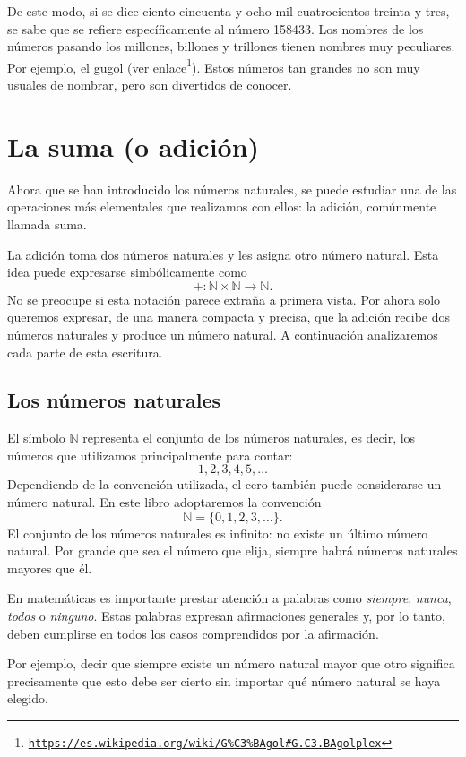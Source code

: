 De este modo, si se dice ciento cincuenta y ocho mil cuatrocientos treinta y tres, se sabe que se refiere específicamente al número 158433. Los nombres de los números pasando los millones, billones y trillones tienen nombres muy peculiares. Por ejemplo, el \href{https://es.wikipedia.org/wiki/G\%C3\%BAgol\#G.C3.BAgolplex}{gugol} (ver enlace\footnote{\href{https://es.wikipedia.org/wiki/G\%C3\%BAgol\#G.C3.BAgolplex}{\texttt{https://es.wikipedia.org/wiki/G\%C3\%BAgol\#G.C3.BAgolplex}}}). Estos números tan grandes no son muy usuales de nombrar, pero son divertidos de conocer.

\section{La suma (o adición)}

Ahora que se han introducido los números naturales, se puede estudiar una de las operaciones más elementales que realizamos con ellos: la adición, comúnmente llamada suma.

La adición toma dos números naturales y les asigna otro número natural. Esta idea puede expresarse simbólicamente como
\[
+\colon\mathbb{N}\times\mathbb{N}\to\mathbb{N}.
\]
No se preocupe si esta notación parece extraña a primera vista. Por ahora solo queremos expresar, de una manera compacta y precisa, que la adición recibe dos números naturales y produce un número natural. A continuación analizaremos cada parte de esta escritura.

\subsection{Los números naturales}

El símbolo \(\mathbb{N}\) representa el conjunto de los números naturales, es decir, los números que utilizamos principalmente para contar:
\[
1,2,3,4,5,\dots
\]
Dependiendo de la convención utilizada, el cero también puede considerarse un número natural. En este libro adoptaremos la convención
\[
\mathbb{N}=\{0,1,2,3,\dots\}.
\]
El conjunto de los números naturales es infinito: no existe un último número natural. Por grande que sea el número que elija, siempre habrá números naturales mayores que él.

\begin{note}
En matemáticas es importante prestar atención a palabras como \emph{siempre}, \emph{nunca}, \emph{todos} o \emph{ninguno}. Estas palabras expresan afirmaciones generales y, por lo tanto, deben cumplirse en todos los casos comprendidos por la afirmación.

Por ejemplo, decir que siempre existe un número natural mayor que otro significa precisamente que esto debe ser cierto sin importar qué número natural se haya elegido.
\end{note}


